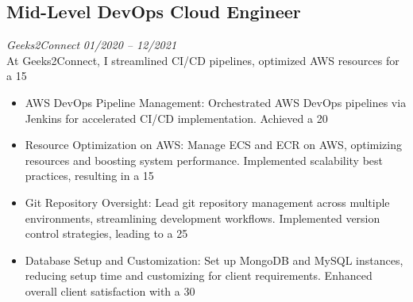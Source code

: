 \documentclass[a4paper,10pt]{article}
\begin{document}
\subsection*{Mid-Level DevOps Cloud Engineer}
\textit{Geeks2Connect} \hfill \textit{01/2020 – 12/2021}\\
At Geeks2Connect, I streamlined CI/CD pipelines, optimized AWS resources for a 15%
\begin{itemize}
    \item AWS DevOps Pipeline Management: Orchestrated AWS DevOps pipelines via Jenkins for accelerated CI/CD implementation. Achieved a 20%
    \item Resource Optimization on AWS: Manage ECS and ECR on AWS, optimizing resources and boosting system performance. Implemented scalability best practices, resulting in a 15%
    \item Git Repository Oversight: Lead git repository management across multiple environments, streamlining development workflows. Implemented version control strategies, leading to a 25%
    \item Database Setup and Customization: Set up MongoDB and MySQL instances, reducing setup time and customizing for client requirements. Enhanced overall client satisfaction with a 30%
\end{itemize}
\end{document}
